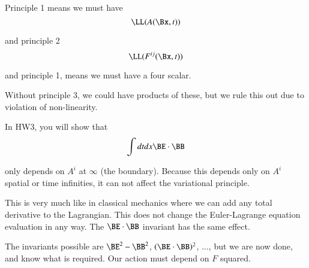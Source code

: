 Principle 1 means we must have
%
\begin{equation}\label{eqn:relativisticElectrodynamicsL12b:230}
\LL(A(\Bx, t))
\end{equation}

and principle 2
%
\begin{equation}\label{eqn:relativisticElectrodynamicsL12b:250}
\LL(F^{ij}(\Bx, t))
\end{equation}

and principle 1, means we must have a four scalar.

Without principle 3, we could have products of these, but we rule this out due to violation of non-linearity.


In HW3, you will show that
%
\begin{equation}\label{eqn:relativisticElectrodynamicsL12b:350}
\int dt dx \BE \cdot \BB
\end{equation}

only depends on \(A^i\) at \(\infty\) (the boundary).  Because this depends only on \(A^i\) spatial or time infinities, it can not affect the variational principle.

This is very much like in classical mechanics where we can add any total derivative to the Lagrangian.  This does not change the Euler-Lagrange equation evaluation in any way.  The \(\BE \cdot \BB\) invariant has the same effect.

The invariants possible are \(\BE^2 - \BB^2\), \((\BE \cdot \BB)^2\), ..., but we are now done, and know what is required.  Our action must depend on \(F\) squared.


